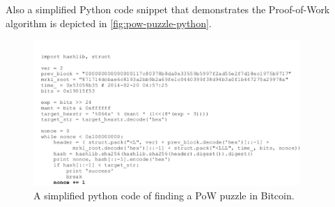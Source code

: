Also a simplified Python code snippet that demonstrates the
Proof-of-Work algorithm is depicted in \autoref{fig:pow-puzzle-python}.
\begin{figure}[t]
	\begin{center}
		\includegraphics[width=0.9\textwidth]{./figs/pow-python.png}
		\caption{A simplified python code of finding a PoW puzzle in Bitcoin.}		
		\label{fig:pow-puzzle-python}
	\end{center}	
\end{figure}



